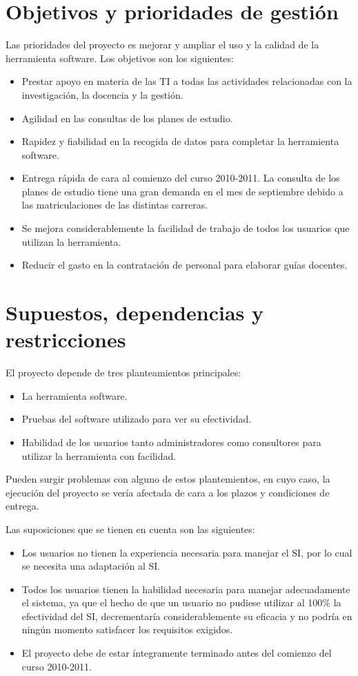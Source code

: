 \documentclass[11pt,a4paper,spanish,twoside]{report}
\begin{document}
\section{Objetivos y prioridades de gestión}
Las prioridades del proyecto es mejorar y ampliar el uso y la calidad de la
herramienta software. Los objetivos son los siguientes:
\begin{itemize}
\item Prestar apoyo en materia de las TI a todas las actividades relacionadas
  con la investigación, la docencia y la gestión.
\item Agilidad en las consultas de los planes de estudio.
\item Rapidez y fiabilidad en la recogida de datos para completar la
  herramienta software.
\item Entrega rápida de cara al comienzo del curso 2010-2011. La consulta de
  los planes de estudio tiene una gran demanda en el mes de septiembre debido
  a las matriculaciones de las distintas carreras.
\item Se mejora considerablemente la facilidad de trabajo de todos los
  usuarios que utilizan la herramienta.
\item Reducir el gasto en la contratación de personal para elaborar guías
  docentes. 
\end{itemize}

\section{Supuestos, dependencias y restricciones}
El proyecto depende de tres planteamientos principales:
\begin{itemize}
\item La herramienta software.
\item Pruebas del software utilizado para ver su efectividad.
\item Habilidad de los usuarios tanto administradores como consultores para
  utilizar la herramienta con facilidad.
\end{itemize}
Pueden surgir problemas con alguno de estos plantemientos, en cuyo caso, la
ejecución del proyecto se vería afectada de cara a los plazos y condiciones
de entrega.

Las suposiciones que se tienen en cuenta son las siguientes:
\begin{itemize}
\item Los usuarios no tienen la experiencia necesaria para manejar el SI, por
  lo cual se necesita una adaptación al SI. 
\item Todos los usuarios tienen la habilidad necesaria para manejar
  adecuadamente el sistema, ya que el hecho de que un usuario no pudiese
  utilizar al 100\% la efectividad del SI, decrementaría considerablemente su
  eficacia y no podría en ningún momento satisfacer los requisitos exigidos.
\item El proyecto debe de estar íntegramente terminado antes del comienzo del
  curso 2010-2011.
\end{itemize}
\end{document}
